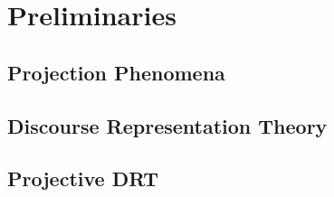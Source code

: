 \section{Preliminaries}\label{sec:preliminaries}

\subsection{Projection Phenomena}

\subsection{Discourse Representation Theory}

\subsection{Projective DRT}\label{sec:pdrt}

